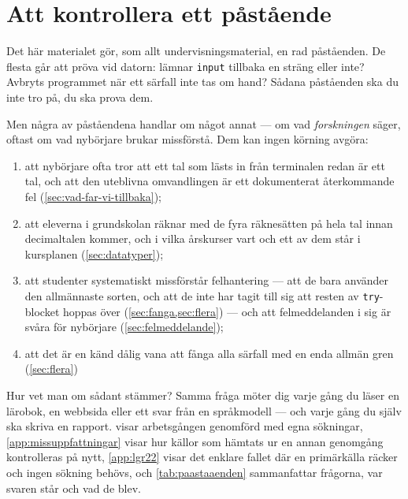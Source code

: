 \setcounter{LTchunksize}{4}

\chapter{Att kontrollera ett påstående}
\label{app:verifiera-inmatning}

Det här materialet gör, som allt undervisningsmaterial, en rad
påståenden.  De flesta går att pröva vid datorn: lämnar
\texttt{input} tillbaka en sträng eller inte?  Avbryts
programmet när ett särfall inte tas om hand?  Sådana påståenden ska du
inte tro på, du ska prova dem.

Men några av påståendena handlar om något annat --- om vad
\emph{forskningen} säger, oftast om vad nybörjare brukar missförstå.
Dem kan ingen körning avgöra:
\begin{enumerate}
  \item att nybörjare ofta tror att ett tal som lästs in från terminalen
    redan är ett tal, och att den uteblivna omvandlingen är ett
    dokumenterat återkommande fel (\cref{sec:vad-far-vi-tillbaka});
  \item att eleverna i grundskolan räknar med de fyra räknesätten på
    hela tal innan decimaltalen kommer, och i vilka årskurser vart och
    ett av dem står i kursplanen (\cref{sec:datatyper});
  \item att studenter systematiskt missförstår felhantering --- att de
    bara använder den allmännaste sorten, och att de inte har tagit till
    sig att resten av \texttt{try}-blocket hoppas över
    (\cref{sec:fanga,sec:flera}) --- och att felmeddelanden i sig är
    svåra för nybörjare (\cref{sec:felmeddelande});
  \item att det är en känd dålig vana att fånga alla särfall med en enda
    allmän gren (\cref{sec:flera})%
\end{enumerate}
Hur vet man om sådant stämmer?  Samma fråga möter dig varje gång du läser
en lärobok, en webbsida eller ett svar från en språkmodell --- och varje
gång du själv ska skriva en rapport.  
visar arbetsgången genomförd med egna sökningar,
\cref{app:missuppfattningar} visar hur källor som hämtats ur en annan
genomgång kontrolleras på nytt, \cref{app:lgr22} visar det enklare
fallet där en primärkälla räcker och ingen sökning behövs, och
\cref{tab:paastaaenden} sammanfattar frågorna, var svaren står och vad
de blev.

